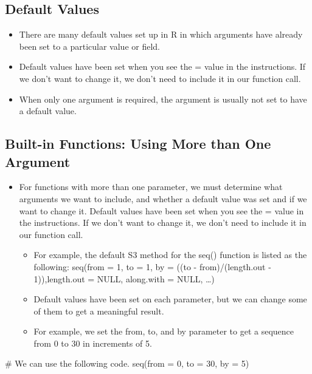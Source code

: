 \documentclass[
  letterpaper,
  DIV=11,
  numbers=noendperiod]{scrreprt}
\newenvironment{Shaded}{\begin{snugshade}}{\end{snugshade}}
\newcommand{\AttributeTok}[1]{\textcolor[rgb]{0.40,0.45,0.13}{#1}}
\newcommand{\CommentTok}[1]{\textcolor[rgb]{0.37,0.37,0.37}{#1}}
\newcommand{\DecValTok}[1]{\textcolor[rgb]{0.68,0.00,0.00}{#1}}
\newcommand{\FunctionTok}[1]{\textcolor[rgb]{0.28,0.35,0.67}{#1}}
\newcommand{\NormalTok}[1]{\textcolor[rgb]{0.00,0.23,0.31}{#1}}
\providecommand{\tightlist}{%
  \setlength{\itemsep}{0pt}\setlength{\parskip}{0pt}}\usepackage{longtable,booktabs,array}
\begin{document}
\subsection{Default Values}\label{default-values}

\begin{itemize}
\tightlist
\item
  There are many default values set up in R in which arguments have
  already been set to a particular value or field.
\item
  Default values have been set when you see the = value in the
  instructions. If we don't want to change it, we don't need to include
  it in our function call.
\item
  When only one argument is required, the argument is usually not set to
  have a default value.
\end{itemize}

\subsection{Built-in Functions: Using More than One
Argument}\label{built-in-functions-using-more-than-one-argument}

\begin{itemize}
\tightlist
\item
  For functions with more than one parameter, we must determine what
  arguments we want to include, and whether a default value was set and
  if we want to change it. Default values have been set when you see the
  = value in the instructions. If we don't want to change it, we don't
  need to include it in our function call.

  \begin{itemize}
  \tightlist
  \item
    For example, the default S3 method for the seq() function is listed
    as the following: seq(from = 1, to = 1, by = ((to -
    from)/(length.out - 1)),length.out = NULL, along.with = NULL,
    \ldots)
  \item
    Default values have been set on each parameter, but we can change
    some of them to get a meaningful result.
  \item
    For example, we set the from, to, and by parameter to get a sequence
    from 0 to 30 in increments of 5.
  \end{itemize}
\end{itemize}

\begin{Shaded}
\begin{Highlighting}[]
\CommentTok{\# We can use the following code.}
\FunctionTok{seq}\NormalTok{(}\AttributeTok{from =} \DecValTok{0}\NormalTok{, }\AttributeTok{to =} \DecValTok{30}\NormalTok{, }\AttributeTok{by =} \DecValTok{5}\NormalTok{)}
\end{Highlighting}
\end{Shaded}
\end{document}

